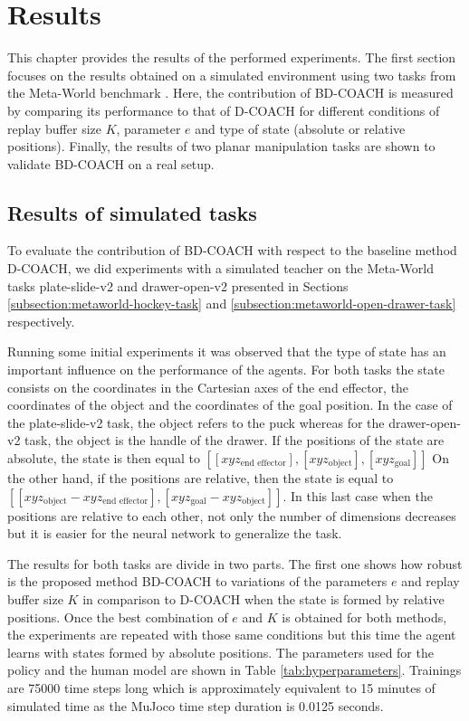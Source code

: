 


\chapter{Results}
\label{chapter:Results}

This chapter provides the results of the performed experiments. The first section focuses on the results obtained on a simulated environment using two tasks from the Meta-World benchmark \cite{metaworld}. Here, the contribution of BD-COACH is measured by comparing its performance to that of D-COACH for different conditions of replay buffer size $K$, parameter $e$ and type of state (absolute or relative positions).
Finally, the results of two planar manipulation tasks are shown to validate BD-COACH on a real setup.



\section{Results of simulated tasks}
\label{section:results_metaworld}

To evaluate the contribution of BD-COACH with respect to the baseline method D-COACH, we did experiments with a simulated teacher on the Meta-World tasks plate-slide-v2 and drawer-open-v2  presented in Sections \ref{subsection:metaworld-hockey-task} and
\ref{subsection:metaworld-open-drawer-task} respectively. 

Running some initial experiments it was observed that the type of state has an important influence on the performance of the agents. For both tasks the state consists on the coordinates in the Cartesian axes of the end effector, the coordinates of the object and the coordinates of the goal position. In the case of the plate-slide-v2 task, the object refers to the puck whereas for the drawer-open-v2 task, the object is the handle of the drawer.
If the positions of the state are absolute, the state is then equal to $[[xyz_\text{end effector}], [xyz_\text{object}], [xyz_\text{goal}]]$ 
On the other hand, if the positions are relative, then the state is equal to $[[xyz_\text{object} - xyz_\text{end effector}], [xyz_\text{goal} - xyz_\text{object}]]$. In this last case when the positions are relative to each other, not only the number of dimensions decreases but it is easier for the neural network to generalize the task.

The results for both tasks are divide in two parts. The first one shows how robust is the proposed method BD-COACH to variations of the parameters $e$ and replay buffer size $K$ in comparison to D-COACH when the state is formed by relative positions. Once the best combination of $e$ and $K$ is obtained for both methods, the experiments are repeated with those same conditions but this time the agent learns with states formed by absolute positions. The parameters used for the policy and the human model are shown in Table \ref{tab:hyperparameters}. Trainings are 75000 time steps long which is approximately equivalent to 15 minutes of simulated time as the MuJoco time step duration is 0.0125 seconds.

